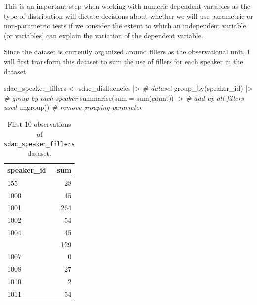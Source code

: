 \documentclass[
  letterpaper,
]{latex/krantz}
\newenvironment{Shaded}{\begin{snugshade}}{\end{snugshade}}
\newcommand{\AttributeTok}[1]{\textcolor[rgb]{0.00,0.00,0.00}{#1}}
\newcommand{\CommentTok}[1]{\textcolor[rgb]{0.00,0.00,0.00}{\textit{#1}}}
\newcommand{\FunctionTok}[1]{\textcolor[rgb]{0.00,0.00,0.00}{#1}}
\newcommand{\NormalTok}[1]{\textcolor[rgb]{0.00,0.00,0.00}{#1}}
\newcommand{\OtherTok}[1]{\textcolor[rgb]{0.00,0.00,0.00}{#1}}
\newcommand{\SpecialCharTok}[1]{\textcolor[rgb]{0.00,0.00,0.00}{#1}}
\begin{document}
\begin{tcolorbox}[enhanced jigsaw, colframe=quarto-callout-warning-color-frame, titlerule=0mm, coltitle=black, colback=white, opacitybacktitle=0.6, colbacktitle=quarto-callout-warning-color!10!white, left=2mm, arc=.35mm, leftrule=.75mm, rightrule=.15mm, bottomtitle=1mm, toptitle=1mm, breakable, bottomrule=.15mm, title=\textcolor{quarto-callout-warning-color}{\faExclamationTriangle}\hspace{0.5em}{Tip}, toprule=.15mm, opacityback=0]

This is an important step when working with numeric dependent variables
as the type of distribution will dictate decisions about whether we will
use parametric or non-parametric tests if we consider the extent to
which an independent variable (or variables) can explain the variation
of the dependent variable.

\end{tcolorbox}

Since the dataset is currently organized around fillers as the
observational unit, I will first transform this dataset to sum the use
of fillers for each speaker in the dataset.

\begin{Shaded}
\begin{Highlighting}[]
\NormalTok{sdac\_speaker\_fillers }\OtherTok{\textless{}{-}} 
\NormalTok{  sdac\_disfluencies }\SpecialCharTok{|\textgreater{}} \CommentTok{\# dataset}
  \FunctionTok{group\_by}\NormalTok{(speaker\_id) }\SpecialCharTok{|\textgreater{}} \CommentTok{\# group by each speaker}
  \FunctionTok{summarise}\NormalTok{(}\AttributeTok{sum =} \FunctionTok{sum}\NormalTok{(count)) }\SpecialCharTok{|\textgreater{}} \CommentTok{\# add up all fillers used}
  \FunctionTok{ungroup}\NormalTok{() }\CommentTok{\# remove grouping parameter}
\end{Highlighting}
\end{Shaded}

\hypertarget{tbl-i-uni-cont-sdac-transform-preview}{}
\begin{table}
\caption{\label{tbl-i-uni-cont-sdac-transform-preview}First 10 observations of \texttt{sdac\_speaker\_fillers} dataset. }\tabularnewline

\centering
\begin{tabular}{lr}
\toprule
speaker\_id & sum\\
\midrule
155 & 28\\
1000 & 45\\
1001 & 264\\
1002 & 54\\
1004 & 45\\
\addlinespace
1005 & 129\\
1007 & 0\\
1008 & 27\\
1010 & 2\\
1011 & 54\\
\bottomrule
\end{tabular}
\end{table}
\end{document}
